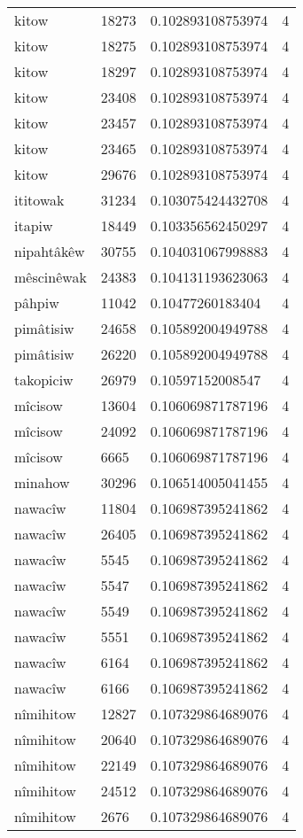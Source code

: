 \begin{longtable}{llll}
kitow & 18273 & 0.102893108753974 & 4 \\
kitow & 18275 & 0.102893108753974 & 4 \\
kitow & 18297 & 0.102893108753974 & 4 \\
kitow & 23408 & 0.102893108753974 & 4 \\
kitow & 23457 & 0.102893108753974 & 4 \\
kitow & 23465 & 0.102893108753974 & 4 \\
kitow & 29676 & 0.102893108753974 & 4 \\
ititowak & 31234 & 0.103075424432708 & 4 \\
itapiw & 18449 & 0.103356562450297 & 4 \\
nipahtâkêw & 30755 & 0.104031067998883 & 4 \\
mêscinêwak & 24383 & 0.104131193623063 & 4 \\
pâhpiw & 11042 & 0.10477260183404 & 4 \\
pimâtisiw & 24658 & 0.105892004949788 & 4 \\
pimâtisiw & 26220 & 0.105892004949788 & 4 \\
takopiciw & 26979 & 0.10597152008547 & 4 \\
mîcisow & 13604 & 0.106069871787196 & 4 \\
mîcisow & 24092 & 0.106069871787196 & 4 \\
mîcisow & 6665 & 0.106069871787196 & 4 \\
minahow & 30296 & 0.106514005041455 & 4 \\
nawacîw & 11804 & 0.106987395241862 & 4 \\
nawacîw & 26405 & 0.106987395241862 & 4 \\
nawacîw & 5545 & 0.106987395241862 & 4 \\
nawacîw & 5547 & 0.106987395241862 & 4 \\
nawacîw & 5549 & 0.106987395241862 & 4 \\
nawacîw & 5551 & 0.106987395241862 & 4 \\
nawacîw & 6164 & 0.106987395241862 & 4 \\
nawacîw & 6166 & 0.106987395241862 & 4 \\
nîmihitow & 12827 & 0.107329864689076 & 4 \\
nîmihitow & 20640 & 0.107329864689076 & 4 \\
nîmihitow & 22149 & 0.107329864689076 & 4 \\
nîmihitow & 24512 & 0.107329864689076 & 4 \\
nîmihitow & 2676 & 0.107329864689076 & 4 \\

\end{longtable}
